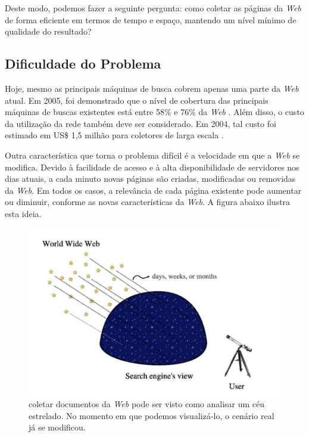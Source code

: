 \documentclass[a4paper,12pt,titlepage]{article}
\begin{document}
Deste modo, podemos fazer a seguinte pergunta: como coletar as páginas da \textit{Web} de forma eficiente em termos de tempo e espaço, mantendo um nível mínimo de qualidade do resultado?

\subsection{Dificuldade do Problema}

Hoje, mesmo as principais máquinas de busca cobrem apenas uma parte da \textit{Web} atual. Em 2005, foi demonstrado que o nível de cobertura das principais máquinas de buscas existentes está entre 58\% e 76\% da \textit{Web} \cite{gulli}. Além disso, o custo da utilização da rede também deve ser considerado. Em 2004, tal custo foi estimado em US\$ 1,5 milhão para coletores de larga escala \cite{craswell}. 

Outra característica que torna o problema difícil é a velocidade em que a \textit{Web} se modifica. Devido à facilidade de acesso e à alta disponibilidade de servidores nos dias atuais, a cada minuto novas páginas são criadas, modificadas ou removidas da \textit{Web}. Em todos os casos, a relevância de cada página existente pode aumentar ou diminuir, conforme as novas características da \textit{Web}. A figura abaixo ilustra esta ideia.

\begin{figure}[H]
     \centering
     \includegraphics[scale=0.3]{figures/stars.png}
     \caption{coletar documentos da \textit{Web} pode ser visto como analisar um céu estrelado. No momento em que podemos visualizá-lo, o cenário real já se modificou.}
     \label{bsp}
\end{figure}
\end{document}
